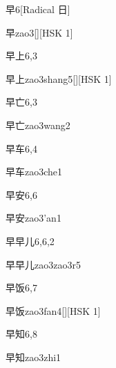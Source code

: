 \begin{entry}{早}{6}[Radical 日]
  \begin{phonetics}{早}{zao3}[][HSK 1]
  \end{phonetics}
\end{entry}

\begin{entry}{早上}{6,3}
  \begin{phonetics}{早上}{zao3shang5}[][HSK 1]
  \end{phonetics}
\end{entry}

\begin{entry}{早亡}{6,3}
  \begin{phonetics}{早亡}{zao3wang2}
  \end{phonetics}
\end{entry}

\begin{entry}{早车}{6,4}
  \begin{phonetics}{早车}{zao3che1}
  \end{phonetics}
\end{entry}

\begin{entry}{早安}{6,6}
  \begin{phonetics}{早安}{zao3'an1}
  \end{phonetics}
\end{entry}

\begin{entry}{早早儿}{6,6,2}
  \begin{phonetics}{早早儿}{zao3zao3r5}
  \end{phonetics}
\end{entry}

\begin{entry}{早饭}{6,7}
  \begin{phonetics}{早饭}{zao3fan4}[][HSK 1]
  \end{phonetics}
\end{entry}

\begin{entry}{早知}{6,8}
  \begin{phonetics}{早知}{zao3zhi1}
  \end{phonetics}
\end{entry}

